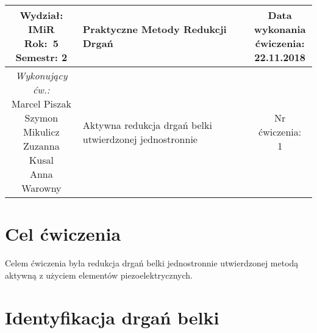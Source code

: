 \documentclass[polish,a4paper,11pt]{mwart}
\let\Oldsection\section
\renewcommand{\section}{\FloatBarrier\Oldsection}
\begin{document}
	\begin{table}[h] %
	\centering
		\begin{tabular}{ | c |  >{\centering\arraybackslash}m{5.5cm} | c | }
			\hline
			\makecell{ \textbf{Wydział:} \\ IMiR \\ \textbf{Rok:}~5 \\ Semestr: 2 } &
			\textbf{\large{Praktyczne Metody Redukcji Drgań}} &
			\makecell{Data \\ wykonania \\ ćwiczenia: \\ 22.11.2018} \\ \hline
      \makecell{\emph{Wykonujący ćw.:} \\ Marcel Piszak \\ Szymon Mikulicz \\ Zuzanna Kusal \\ Anna Warowny} &
			\large{Aktywna redukcja drgań belki utwierdzonej jednostronnie} &
			\makecell{Nr ćwiczenia: \\ 1} \\ \hline
		\end{tabular}
	\end{table}

  \section{Cel ćwiczenia}

  Celem ćwiczenia była redukcja drgań belki jednostronnie utwierdzonej metodą
  aktywną z użyciem elementów piezoelektrycznych.

  \section{Identyfikacja drgań belki}
\end{document}
